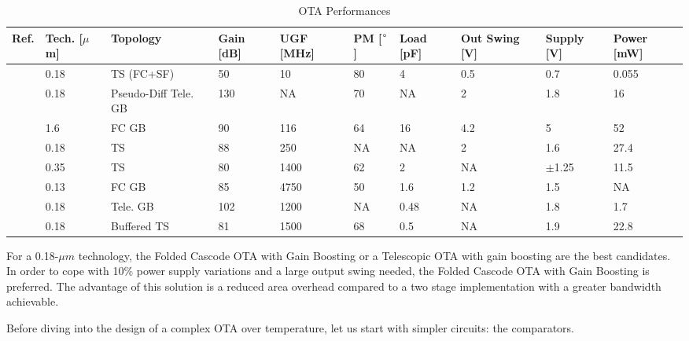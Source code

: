 \begin{table}[htp]
	\caption{OTA Performances}
	\centering
	\label{table:ota_comparison_table}
	\begin{tabular}{L{5\charwidth} L{4.2\charwidth} L{11\charwidth} R{4.5\charwidth} R{4.5\charwidth} R{3.5\charwidth} R{4.5\charwidth} C{9\charwidth} C{6.2\charwidth} C{5.5\charwidth}}
	\toprule
	Ref. & Tech. [\(\mu \)m] & Topology & Gain [dB] & UGF [MHz] & PM [\(\degree \)] & Load [pF] & Out Swing [V] & Supply [V] & Power [mW] \\
    \midrule
    \cite{Sauerbrey2002}  & 0.18 & TS (FC+SF\footnotemark[1]) & 50  &   10 & 80 & 4    & 0.5 & 0.7 & 0.055 \\
    \cite{Chiu2004}       & 0.18 & Pseudo-Diff Tele. GB       & 130 &   NA & 70 &   NA & 2\footnotemark[2] & 1.8 & 16 \\
    \cite{Bult1991}       &  1.6 & FC GB                      & 90  &  116 & 64 & 16   & 4.2 & 5 & 52 \\
    \cite{Miyahara2014}   & 0.18 & TS                         & 88  &  250 & NA &   NA & 2\footnotemark[2] & 1.6 & 27.4 \\
    \cite{Thandri2006}    & 0.35 & TS                         & 80  & 1400 & 62 &  2   & NA & \(\pm \)1.25 & 11.5 \\
    \cite{Zhang2015PRIME} & 0.13 & FC GB                      & 85  & 4750 & 50 &  1.6 & 1.2 & 1.5 & NA \\
    \cite{Liu2015OpAmp}   & 0.18 & Tele. GB                   & 102 & 1200 & NA & 0.48 & NA  & 1.8 & 1.7 \\
    \cite{Sun2016}        & 0.18 & Buffered TS                & 81  & 1500 & 68 &  0.5 & NA  & 1.9 & 22.8 \\
	\bottomrule
	\end{tabular}
\end{table}

For a 0.18-$\mu m$ technology, the Folded Cascode OTA with Gain Boosting or a Telescopic OTA with gain boosting are the best candidates. In order to cope with 10\% power supply variations and a large output swing needed, the Folded Cascode OTA with Gain Boosting is preferred.
The advantage of this solution is a reduced area overhead compared to a two stage implementation with a greater bandwidth achievable.

Before diving into the design of a complex OTA over temperature, let us start with simpler circuits: the comparators.


